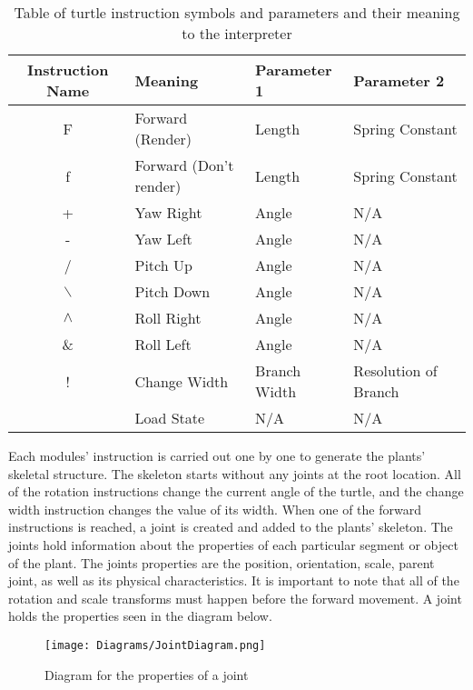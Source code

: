 \begin{table}[h!]
\centering
\begin{tabular}{ | c | l | l | l |}
\hline
	Instruction Name  & Meaning					& Parameter 1 	& Parameter 2 					\\  
\hline
\hline
	F 				&	Forward (Render)		& Length		& Spring Constant				\\
\hline
	f 				&	Forward (Don't render)	& Length 		& Spring Constant				\\
\hline
	+ 				&	Yaw	Right				& Angle 		&	N/A							\\
\hline
	- 				&	Yaw Left				& Angle			&	N/A							\\
\hline
	/ 				&	Pitch Up				& Angle			&	N/A							\\
\hline
	$\backslash$ 	&	Pitch Down				& Angle			&	N/A							\\
\hline
	$\land$ 		&	Roll Right				& Angle			&	N/A							\\
\hline
	\& 				&	Roll Left				& Angle 		&	N/A							\\
\hline
	! 				&	Change Width			& Branch Width	&	Resolution of Branch		\\
\hline
	[ 				&	Save State				& N/A			&	N/A							\\
\hline
	] 				&	Load State				& N/A 			&	N/A							\\
\hline
\end{tabular}
\caption{Table of turtle instruction symbols and parameters and their meaning to the interpreter}
\label{instruction table 1}
\end{table}
\FloatBarrier

\noindent
Each modules' instruction is carried out one by one to generate the plants' skeletal structure. The skeleton starts without any joints at the root location. All of the rotation instructions change the current angle of the turtle, and the change width instruction changes the value of its width. When one of the forward instructions is reached, a joint is created and added to the plants' skeleton. The joints hold information about the properties of each particular segment or object of the plant. The joints properties are the position, orientation, scale, parent joint, as well as its physical characteristics. It is important to note that all of the rotation and scale transforms must happen before the forward movement. A joint holds the properties seen in the diagram below.

\begin{figure}[htbp]
	{\centering
		\vspace{7px}
		\texttt{[image: Diagrams/JointDiagram.png]}
		\caption{Diagram for the properties of a joint} \label{joint properties}
	}
\end{figure}
\FloatBarrier

